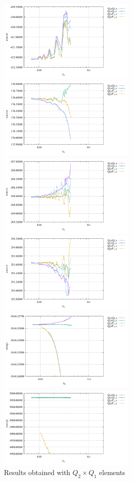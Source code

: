 \begin{center}
\includegraphics[width=6.65cm]{python_codes/fieldstone_25/newresults/min_u_iso.pdf}
\includegraphics[width=6.65cm]{python_codes/fieldstone_25/newresults/max_u_iso.pdf}\\
\includegraphics[width=6.65cm]{python_codes/fieldstone_25/newresults/min_v_iso.pdf}
\includegraphics[width=6.65cm]{python_codes/fieldstone_25/newresults/max_v_iso.pdf}\\
\includegraphics[width=6.65cm]{python_codes/fieldstone_25/newresults/min_p_iso.pdf}
\includegraphics[width=6.65cm]{python_codes/fieldstone_25/newresults/max_p_iso.pdf}\\
{\captionfont Results obtained with $Q_2\times Q_1$ elements} 
\end{center}

